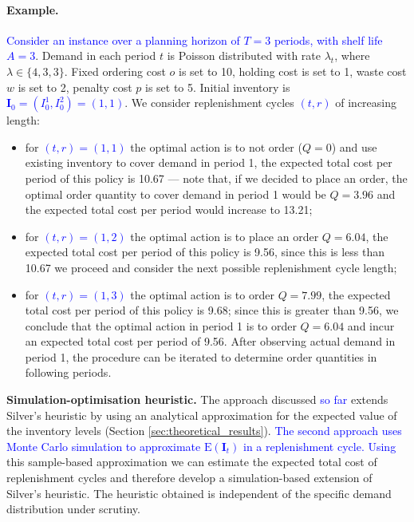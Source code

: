 \documentclass{tPRS2e}
\newcommand{\blue}{\textcolor{blue}}
\begin{document}
\paragraph*{\bf Example.} \blue{Consider an instance over a planning horizon of $T=3$ periods, with shelf life $A=3$}. Demand in each period $t$ is Poisson distributed with rate $\lambda_t$, where $\lambda\in\{4,3,3\}$. Fixed ordering cost $o$ is set to 10, holding cost is set to 1, waste cost $w$ is set to 2, penalty cost $p$ is set to 5. Initial inventory is \blue{$\mathbf{I}_{0}=(I^1_{0},I^2_{0})=(1,1)$}. We consider replenishment cycles \blue{$(t,r)$} of increasing length: 
\begin{itemize}
\item
for \blue{$(t,r)=(1,1)$} the optimal action is to not order ($Q=0$) and use existing inventory to cover demand in period 1, the expected total cost per period of this policy is 10.67 --- note that, if we decided to place an order, the optimal order quantity to cover demand in period 1 would be $Q=3.96$ and the expected total cost per period would increase to 13.21; 
\item
for \blue{$(t,r)=(1,2)$} the optimal action is to place an order $Q=6.04$, the expected total cost per period of this policy is 9.56, since this is less than 10.67 we proceed and consider the next possible replenishment cycle length; 
\item
for \blue{$(t,r)=(1,3)$} the optimal action is to order $Q=7.99$, the expected total cost per period of this policy is 9.68; since this is greater than 9.56, we conclude that the optimal action in period 1 is to order $Q=6.04$ and incur an expected total cost per period of 9.56. After observing actual demand in period 1, the procedure can be iterated to determine order quantities in following periods.
\end{itemize}



\vspace{1em}
\noindent
{\bf Simulation-optimisation heuristic.} 
The approach discussed \blue{so far} extends Silver's heuristic by using an analytical approximation for the expected value of the inventory levels (Section \ref{sec:theoretical_results}). \blue{The second approach uses Monte Carlo simulation to approximate $\mathrm{E}(\mathbf{I}_t)$ in a replenishment cycle. Using} this sample-based approximation we can estimate the expected total cost of replenishment cycles and therefore develop a simulation-based extension of Silver's heuristic. The heuristic obtained is independent of the specific demand distribution under scrutiny.
\end{document}
